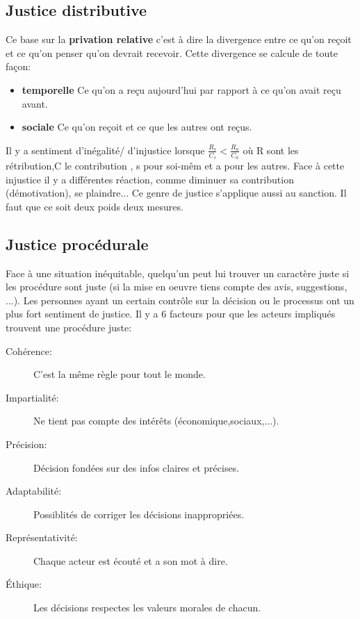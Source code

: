 \documentclass[11pt]{article} %
\begin{document}
	\subsection{Justice distributive}
		Ce base sur la \textbf{privation relative} c'est à dire la divergence entre ce qu'on reçoit et ce qu'on 
		penser qu'on devrait recevoir. Cette divergence se calcule de toute façon:
		\begin{itemize}
			\item \textbf{temporelle} Ce qu'on a reçu aujourd'hui par rapport à ce qu'on avait reçu avant.
			\item \textbf{sociale} Ce qu'on reçoit et ce que les autres ont reçus.
		\end{itemize}
		Il y a sentiment d'inégalité/ d'injustice  lorsque $\frac{R_s}{C_s}<\frac{R_a}{C_a}$ où R sont les 
		rétribution,C le contribution , s pour soi-mêm et a pour les autres. Face à cette injustice il y a 
		différentes réaction, comme diminuer sa contribution (démotivation), se plaindre... Ce genre de justice 
		s'applique aussi au sanction. Il faut que ce soit deux poids deux mesures.




	\subsection{Justice procédurale}
		Face à une situation inéquitable, quelqu'un peut lui trouver un caractère juste si les procédure sont 
		juste (si la mise en oeuvre tiens compte des avis, suggestions, ...). Les personnes ayant un certain contrôle sur la décision ou le processus ont un plus fort 
		sentiment de justice. Il y a 6 facteurs pour  que les acteurs impliqués trouvent une procédure juste:
		\begin{description}
			\item[Cohérence:] C'est la même règle pour tout le monde.
			\item[Impartialité: ] Ne tient pas compte des intérêts (économique,sociaux,...).
			\item[Précision: ] Décision fondées sur des infos claires et précises.
			\item[Adaptabilité: ] Possiblités de corriger les décisions inappropriées.
			\item[Représentativité: ] Chaque acteur est écouté et a son mot à dire.
			\item[Éthique: ] Les décisions respectes les valeurs morales de chacun.
		\end{description}
\end{document}
